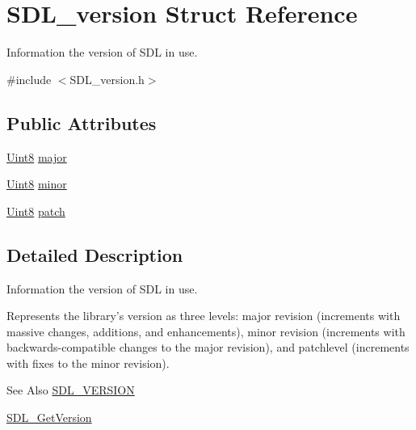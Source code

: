 \hypertarget{struct_s_d_l__version}{\section{S\-D\-L\-\_\-version Struct Reference}
\label{struct_s_d_l__version}
}


Information the version of S\-D\-L in use.  




{\ttfamily \#include $<$S\-D\-L\-\_\-version.\-h$>$}

\subsection*{Public Attributes}
\begin{DoxyCompactItemize}
\item 
\hyperlink{_s_d_l__stdinc_8h_a2944638813a090aa23e62f4da842c3e2}{Uint8} \hyperlink{struct_s_d_l__version_ad7d7674532073eed237b90f546c97cd0}{major}
\item 
\hyperlink{_s_d_l__stdinc_8h_a2944638813a090aa23e62f4da842c3e2}{Uint8} \hyperlink{struct_s_d_l__version_a6c35c7bf80245028d5970e6a504ecf57}{minor}
\item 
\hyperlink{_s_d_l__stdinc_8h_a2944638813a090aa23e62f4da842c3e2}{Uint8} \hyperlink{struct_s_d_l__version_aa6dacff18edee8cd037c773b843be0f1}{patch}
\end{DoxyCompactItemize}


\subsection{Detailed Description}
Information the version of S\-D\-L in use. 

Represents the library's version as three levels\-: major revision (increments with massive changes, additions, and enhancements), minor revision (increments with backwards-\/compatible changes to the major revision), and patchlevel (increments with fixes to the minor revision).

\begin{DoxySeeAlso}{See Also}
\hyperlink{_s_d_l__version_8h_a7154bc5c2a95a644b5187e4225cdcbd0}{S\-D\-L\-\_\-\-V\-E\-R\-S\-I\-O\-N} 

\hyperlink{_s_d_l__version_8h_a4204ecbb600f51ee50515979e60bf8f3}{S\-D\-L\-\_\-\-Get\-Version} 
\end{DoxySeeAlso}


